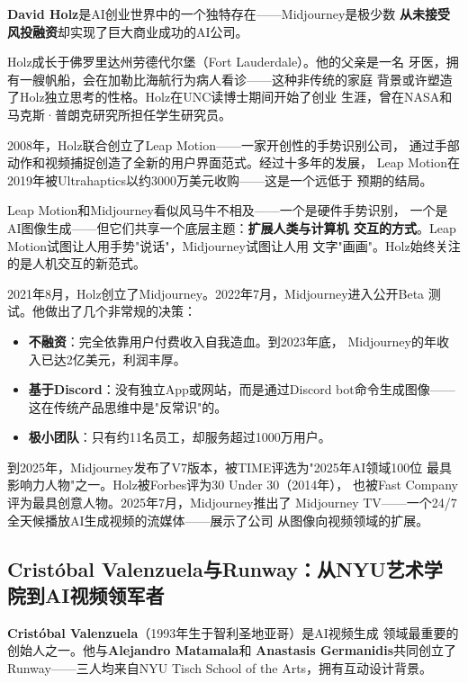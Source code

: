 \textbf{David Holz}是AI创业世界中的一个独特存在——Midjourney是极少数
\textbf{从未接受风投融资}却实现了巨大商业成功的AI公司。

Holz成长于佛罗里达州劳德代尔堡（Fort Lauderdale）。他的父亲是一名
牙医，拥有一艘帆船，会在加勒比海航行为病人看诊——这种非传统的家庭
背景或许塑造了Holz独立思考的性格。Holz在UNC读博士期间开始了创业
生涯，曾在NASA和马克斯·普朗克研究所担任学生研究员。

2008年，Holz联合创立了Leap Motion——一家开创性的手势识别公司，
通过手部动作和视频捕捉创造了全新的用户界面范式。经过十多年的发展，
Leap Motion在2019年被Ultrahaptics以约3000万美元收购——这是一个远低于
预期的结局。

\begin{keybox}
Leap Motion和Midjourney看似风马牛不相及——一个是硬件手势识别，
一个是AI图像生成——但它们共享一个底层主题：\textbf{扩展人类与计算机
交互的方式}。Leap Motion试图让人用手势"说话"，Midjourney试图让人用
文字"画画"。Holz始终关注的是人机交互的新范式。
\end{keybox}

2021年8月，Holz创立了Midjourney。2022年7月，Midjourney进入公开Beta
测试。他做出了几个非常规的决策：

\begin{itemize}
  \item \textbf{不融资}：完全依靠用户付费收入自我造血。到2023年底，
    Midjourney的年收入已达2亿美元，利润丰厚。
  \item \textbf{基于Discord}：没有独立App或网站，而是通过Discord
    bot命令生成图像——这在传统产品思维中是"反常识"的。
  \item \textbf{极小团队}：只有约11名员工，却服务超过1000万用户。
\end{itemize}

到2025年，Midjourney发布了V7版本，被TIME评选为"2025年AI领域100位
最具影响力人物"之一。Holz被Forbes评为30 Under 30（2014年），
也被Fast Company评为最具创意人物。2025年7月，Midjourney推出了
Midjourney TV——一个24/7全天候播放AI生成视频的流媒体——展示了公司
从图像向视频领域的扩展。

\subsection{Cristóbal Valenzuela与Runway：从NYU艺术学院到AI视频领军者}
\label{subsec:founders-runway}

\textbf{Cristóbal Valenzuela}（1993年生于智利圣地亚哥）是AI视频生成
领域最重要的创始人之一。他与\textbf{Alejandro Matamala}和
\textbf{Anastasis Germanidis}共同创立了Runway——三人均来自NYU Tisch
School of the Arts，拥有互动设计背景。

